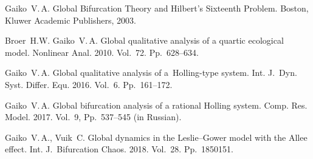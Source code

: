 \documentclass[12pt]{llncs}
\begin{document}
\begin{thebibliography}{9}
Gaiko~V.\,A. Global Bifurcation Theory and Hilbert's Sixteenth Problem. Boston, Kluwer
Academic Publishers, 2003.

Broer~H.W. Gaiko~V.\,A. Global qualitative analysis of a quartic ecological model.
Nonlinear Anal. 2010. Vol.~72. Pp.~628--634.

Gaiko~V.\,A. Global qualitative analysis of a~Holling-type system. Int. J.~Dyn. Syst.
Differ. Equ. 2016. Vol.~6. Pp.~161--172.

Gaiko~V.\,A. Global bifurcation analysis of a rational Holling system. Comp. Res. Model.
2017. Vol.~9, Pp.~537--545 (in Russian).

Gaiko~V.\,A., Vuik~C. Global dynamics in the Leslie--Gower model with the Allee effect.
Int. J.~Bifurcation Chaos. 2018. Vol.~28. Pp.~1850151.
\end{thebibliography}
\end{document}
